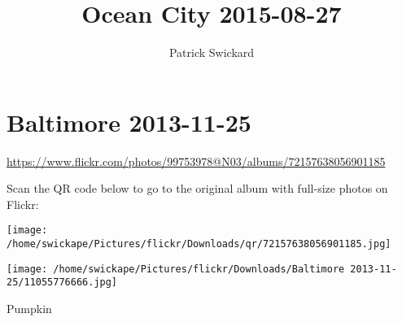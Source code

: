 \documentclass[10pt,letterpaper]{article}
\title{Ocean City 2015-08-27}
\author{Patrick Swickard}
\date{}
\begin{document}
\section*{Baltimore 2013-11-25}

\url{https://www.flickr.com/photos/99753978@N03/albums/72157638056901185}

Scan the QR code below to go to the original album with full-size photos on Flickr:

\texttt{[image: /home/swickape/Pictures/flickr/Downloads/qr/72157638056901185.jpg]}
\pagebreak

\texttt{[image: /home/swickape/Pictures/flickr/Downloads/Baltimore 2013-11-25/11055776666.jpg]}

Pumpkin
\pagebreak
\end{document}
